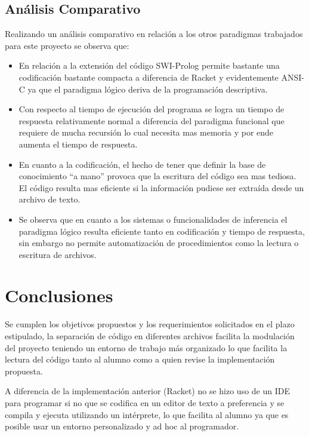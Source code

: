 \documentclass[letterpaper,12pt]{report}
\begin{document}
\section {Análisis Comparativo}
    
Realizando un análisis comparativo en relación a los otros paradigmas trabajados para este proyecto se observa que:

\begin{itemize}

    \item En relación a la extensión del código SWI-Prolog permite bastante una codificación bastante compacta a diferencia de Racket y evidentemente ANSI-C ya que el paradigma lógico deriva de la programación descriptiva.

    \item Con respecto al tiempo de ejecución del programa se logra un tiempo de respuesta relativamente normal a diferencia del paradigma funcional que requiere de mucha recursión lo cual necesita mas memoria y por ende aumenta el tiempo de respuesta.

    \item En cuanto a la codificación, el hecho de tener que definir la base de conocimiento ``a mano'' provoca que la escritura del código sea mas tediosa. El código resulta mas eficiente si la información pudiese ser extraída desde un archivo de texto.

    \item Se observa que en cuanto a los sistemas o funcionalidades de inferencia el paradigma lógico resulta eficiente tanto en codificación y tiempo de respuesta, sin embargo no permite automatización de procedimientos como la lectura o escritura de archivos.

\end{itemize}
    

\chapter{Conclusiones}

Se cumplen los objetivos propuestos y los requerimientos solicitados en el plazo estipulado, la separación de código en diferentes archivos facilita la modulación del proyecto teniendo un entorno de trabajo más organizado lo que facilita la lectura del código tanto al alumno como a quien revise la implementación propuesta. 

A diferencia de la implementación anterior (Racket) no se hizo uso de un IDE para programar si no que se codifica en un editor de texto a preferencia y se compila y ejecuta utilizando un intérprete, lo que facilita al alumno ya que es posible usar un entorno personalizado y ad hoc al programador.
\end{document}
